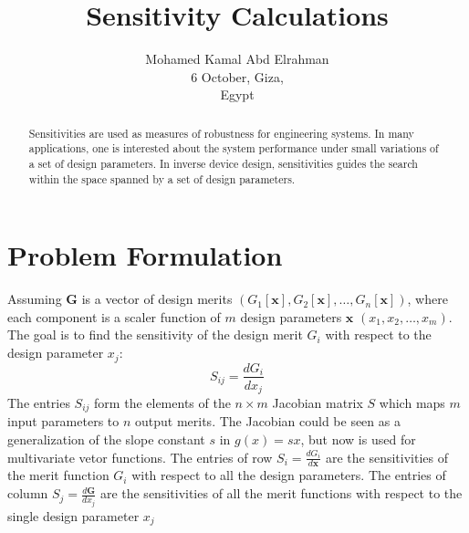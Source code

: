 \documentclass{tufte-handout}
\title{Sensitivity Calculations}
\author[mohamedkamal]{Mohamed Kamal Abd Elrahman \\
6 October, Giza,\\ Egypt}
\begin{document}
	\maketitle
	\begin{abstract}
		\noindent 
	Sensitivities are used as measures of robustness for engineering systems. In many applications, one is interested about the system performance under small variations of a set of design parameters. In inverse device design, sensitivities guides the search within the space spanned by a set of design parameters. 
	\end{abstract}
\section{Problem Formulation}	
 Assuming $\mathbf{G}$	is a vector of design merits $ (G_1[\mathbf{x}], G_2[\mathbf{x}], \dots,G_n[\mathbf{x}]) $, where each component is a scaler function of $m$ design parameters $\mathbf{x}$	$ (x_1,x_2,\dots, x_m)$. The goal is to find the sensitivity of the design merit $G_i$  with respect to the design parameter $x_j$:
	 \begin{equation}
	 S_{ij} = \frac{d G_i}{dx_j}
	 \end{equation}
The entries $S_{ij}$ form the elements of the  $n \times m$  Jacobian matrix $S$ which maps $m$ input parameters to $n$ output merits.   The Jacobian could be seen as a generalization of the slope constant $s$ in $g(x) = s x$, but now is used for multivariate vetor functions. The entries of row $S_i = \frac{d G_i}{d \mathbf{x}}$ are the sensitivities of the merit function $G_i$ with respect to all the design parameters. The entries of column $S_j = \frac{d \mathbf{G}}{d x_j}$ are the sensitivities of all the merit functions with respect to the single design parameter $x_j$

\end{document}
